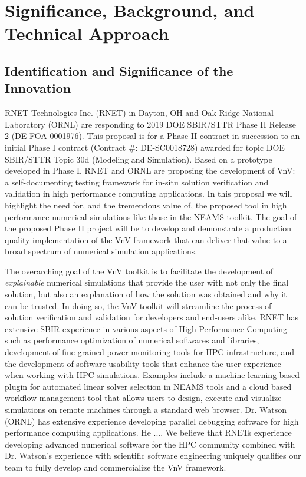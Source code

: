 


\section{Significance, Background, and Technical Approach}

\subsection{Identification and Significance of the Innovation}
\label{sec:identification}

RNET Technologies Inc. (RNET) in Dayton, OH and Oak Ridge National Laboratory 
(ORNL) are responding to 2019 DOE SBIR/STTR Phase II Release 2 
(DE-FOA-0001976). This proposal is for a Phase II contract in succession to an 
initial Phase I contract (Contract \#: DE-SC0018728) awarded for topic DOE 
SBIR/STTR Topic 30d (Modeling and Simulation). Based on a prototype developed in Phase I, RNET and ORNL are proposing the development of VnV: a self-documenting 
testing framework for in-situ solution verification and validation in high performance computing applications. In this proposal we will highlight the need for, and the tremendous value of, the proposed tool in high performance numerical simulations like those in the NEAMS toolkit. The goal of the proposed Phase II project will be to develop and demonstrate a production quality implementation of the VnV framework that can deliver that value to a broad spectrum of numerical simulation applications. 

The overarching goal of the VnV toolkit is to facilitate the development of \emph{explainable} numerical simulations that provide 
the user with not only the final solution, but also an explanation of how the solution was obtained and why it can be trusted. In doing so, the VnV toolkit will streamline the process of solution verification and validation for developers and end-users alike. RNET has extensive SBIR experience in various aspects of High Performance Computing such as performance optimization of numerical softwares and libraries, development of fine-grained power monitoring tools for HPC infrastructure, and the development of software usability tools that enhance the user experience when working with HPC simulations. Examples include a machine learning based plugin for automated linear solver selection in NEAMS tools and a cloud based workflow management tool that allows users to design, execute and visualize simulations on remote machines through a standard web browser. Dr. Watson (ORNL) has extensive experience developing parallel debugging software for high performance computing applications. He .... We believe that RNETs experience developing advanced numerical software for the HPC community combined with Dr. Watson's experience with scientific software engineering uniquely qualifies our team to fully develop and commercialize the VnV framework.

